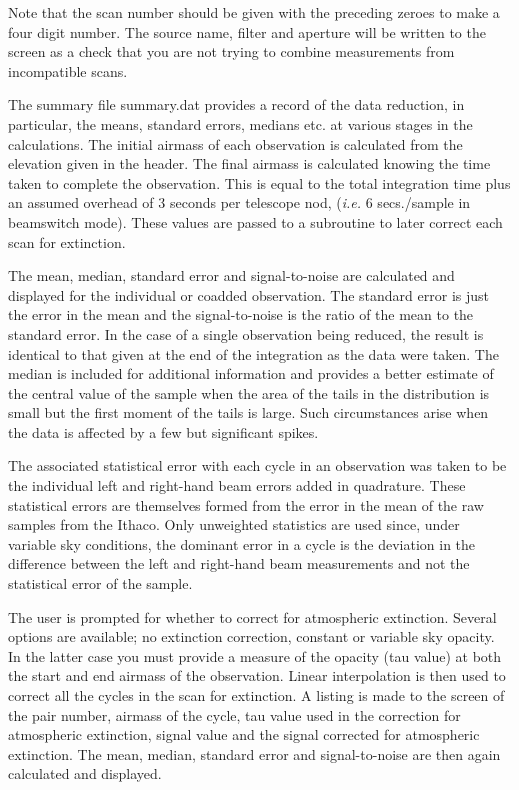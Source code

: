 Note that the scan number should be given with the preceding zeroes to make a
four digit number. The source name, filter and aperture will be written to the
screen as a check that you are not trying to combine measurements from
incompatible scans.

The summary file summary.dat provides a record of the data reduction, in
particular, the means, standard errors, medians etc. at various stages in the
calculations.
The initial airmass of each observation is calculated from the elevation given
in the
header. The final airmass is calculated knowing the time taken to complete the
observation. This is equal to the total integration time plus an assumed
overhead of 3 seconds per telescope nod, ({\it i.e.} 6 secs./sample in
beamswitch mode). These values are passed to a subroutine to later correct
each scan for extinction.

 The mean, median, standard error and signal-to-noise are
calculated and displayed for the individual or coadded observation.
The standard error is just the error in the mean and the signal-to-noise
is the ratio of the mean to the standard error. In the case
of a single observation being reduced, the result is identical to that given at
the end of the integration as the data were taken. The median is included for
additional information and provides a better estimate of the central value of
the sample  when the area of the tails in the distribution is small but the
first moment of the tails is large. Such circumstances arise when the data is
affected by a few but significant spikes.

The associated statistical error with each cycle in an observation was taken
to be the individual left and right-hand beam errors added in quadrature.
These statistical errors are themselves formed from the error in the mean of
the raw samples from the Ithaco.
Only unweighted statistics are
used since, under variable sky conditions, the dominant error in a cycle
is the deviation in the difference between the left and right-hand beam
measurements and not the statistical error of the sample.

 The user is prompted for whether to correct for
atmospheric extinction. Several options are available; no extinction
correction, constant or variable sky opacity. In the latter case you
must provide
a measure of the opacity (tau value) at both the start and end airmass of the
observation. Linear interpolation is then used to correct all the cycles in
the scan for extinction. A listing is made to the screen of the pair number,
airmass of the cycle, tau value used in the correction for atmospheric
extinction, signal value and the signal corrected for atmospheric extinction.
The mean, median, standard error and signal-to-noise are then again
calculated and displayed.


